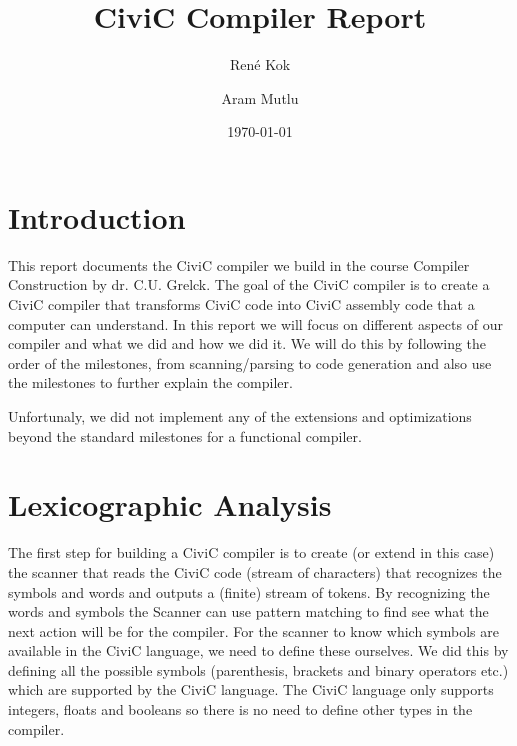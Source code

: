 \documentclass{uva-inf-article}
\title{CiviC Compiler Report}
\author{René Kok}
\author{Aram Mutlu}
\date{\today}
\begin{document}
\maketitle




\section{Introduction}
\par This report documents the CiviC compiler we build in 
the course Compiler Construction by dr. C.U. Grelck. The goal of the CiviC compiler 
is to create a CiviC compiler that transforms CiviC code into CiviC assembly code 
that a computer can understand. In this report we will focus on different aspects 
of our compiler and what we did and how we did it. We will do this by following the order of the milestones,
from scanning/parsing to code generation and also use the milestones to further 
explain the compiler.

Unfortunaly, we did not implement any of the extensions and optimizations beyond the standard 
milestones for a functional compiler.

\newpage
\section{Lexicographic Analysis}
The first step for building a CiviC compiler is to create (or extend in this case) 
the scanner that reads the CiviC code (stream of characters) that recognizes the 
symbols and words and outputs a (finite) stream of tokens.
By recognizing the words and symbols the Scanner can use pattern matching to find see
what the next action will be for the compiler. For the scanner to know which symbols
are available in the CiviC language, we need to define these ourselves. We did this 
by defining all the possible symbols (parenthesis, brackets and binary operators etc.)
which are supported by the CiviC language. The CiviC language only supports integers,
floats and booleans so there is no need to define other types in the compiler.
\end{document}
